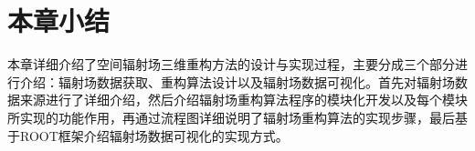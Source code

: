 \section{本章小结}
本章详细介绍了空间辐射场三维重构方法的设计与实现过程，主要分成三个部分进行介绍：辐射场数据获取、重构算法设计以及辐射场数据可视化。首先对辐射场数据来源进行了详细介绍，然后介绍辐射场重构算法程序的模块化开发以及每个模块所实现的功能作用，再通过流程图详细说明了辐射场重构算法的实现步骤，最后基于ROOT框架介绍辐射场数据可视化的实现方式。